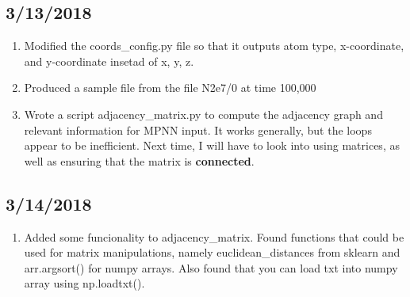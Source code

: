 \documentclass[12pt,reqno]{amsart}
\numberwithin{equation}{section}
\begin{document}
\subsection{3/13/2018}
\begin{enumerate}
\item Modified the coords\_config.py file so that it outputs atom type, x-coordinate, and y-coordinate insetad of x, y, z.  
\item Produced a sample file from the file N2e7/0 at time 100,000
\item Wrote a script adjacency\_matrix.py to compute the adjacency graph and relevant information for MPNN input.  It works generally, but the loops appear to be inefficient.  Next time, I will have to look into using matrices, as well as ensuring that the matrix is \textbf{connected}.  
\end{enumerate}

\subsection{3/14/2018}
\begin{enumerate}
\item Added some funcionality to adjacency\_matrix.  Found functions that could be used for matrix manipulations, namely euclidean\_distances from sklearn and arr.argsort() for numpy arrays.  Also found that you can load txt into numpy array using np.loadtxt().  
\end{enumerate}
\end{document}
